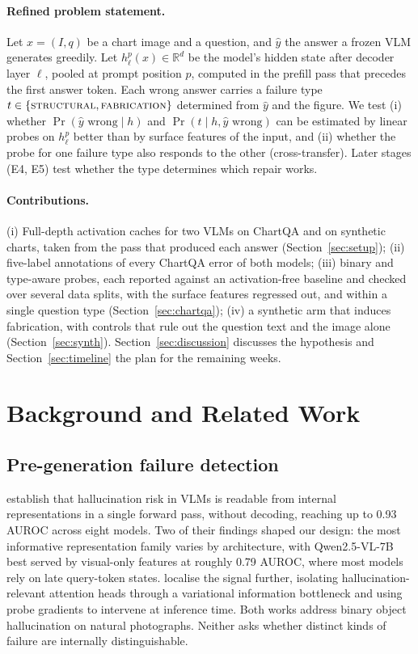 \documentclass[11pt]{article}
\newcommand{\qwen}{Qwen2.5-VL-7B\xspace}
\newcommand{\cls}[1]{\textsc{#1}}
\begin{document}
\paragraph{Refined problem statement.} Let $x=(I,q)$ be a chart image and a
question, and $\hat{y}$ the answer a frozen VLM generates greedily. Let
$h_{\ell}^{p}(x)\in\mathbb{R}^{d}$ be the model's hidden state after decoder
layer $\ell$, pooled at prompt position $p$, computed in the prefill pass that
precedes the first answer token. Each wrong answer carries a failure type
$t\in\{\cls{structural},\cls{fabrication}\}$ determined from $\hat{y}$ and the
figure. We test (i) whether $\Pr(\hat{y}\text{ wrong}\mid h)$ and
$\Pr(t\mid h, \hat{y}\text{ wrong})$ can be estimated by linear probes on
$h_\ell^p$ better than by surface features of the input, and (ii) whether the
probe for one failure type also responds to the other (cross-transfer). Later
stages (E4, E5) test whether the type determines which repair works.

\paragraph{Contributions.} (i) Full-depth activation caches for two VLMs on
ChartQA and on synthetic charts, taken from the pass that produced each answer
(Section~\ref{sec:setup}); (ii) five-label annotations of every ChartQA error of
both models; (iii) binary and type-aware probes, each reported against an
activation-free baseline and checked over several data splits, with the surface
features regressed out, and within a single question type
(Section~\ref{sec:chartqa}); (iv) a synthetic arm that induces fabrication, with
controls that rule out the question text and the image alone
(Section~\ref{sec:synth}). Section~\ref{sec:discussion} discusses the
hypothesis and Section~\ref{sec:timeline} the plan for the remaining weeks.

\section{Background and Related Work}

\subsection{Pre-generation failure detection}
\citet{kogilathota2026halp} establish that hallucination risk in VLMs is
readable from internal representations in a single forward pass, without
decoding, reaching up to 0.93 AUROC across eight models. Two of their findings
shaped our design: the most informative representation family varies by
architecture, with \qwen best served by visual-only features at roughly 0.79
AUROC, where most models rely on late query-token states.
\citet{zhang2026vibprobe} localise the signal further, isolating
hallucination-relevant attention heads through a variational information
bottleneck and using probe gradients to intervene at inference time. Both works
address binary object hallucination on natural photographs. Neither asks
whether distinct kinds of failure are internally distinguishable.
\end{document}
